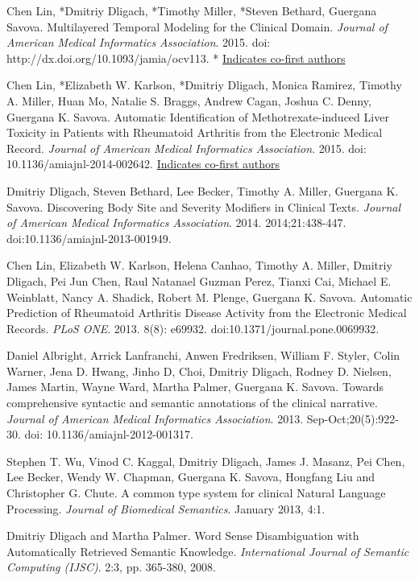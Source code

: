 \documentclass[letterpaper]{article}
\renewenvironment{itemize}{
  \begin{list}{}{
    \setlength{\leftmargin}{1.5em}
  }
}{
  \end{list}
}
\begin{document}
\begin{itemize}
\item *Chen Lin, *Dmitriy Dligach, *Timothy Miller, *Steven Bethard, Guergana Savova. Multilayered Temporal Modeling for the Clinical Domain. \emph{Journal of American Medical Informatics Association}. 2015. doi: http://dx.doi.org/10.1093/jamia/ocv113. * \underline{Indicates co-first authors}
\item *Chen Lin, *Elizabeth W. Karlson, *Dmitriy Dligach, Monica Ramirez, Timothy A. Miller, Huan Mo, Natalie S. Braggs, Andrew Cagan, Joshua C. Denny, Guergana K. Savova. Automatic Identification of Methotrexate-induced Liver Toxicity in Patients with Rheumatoid Arthritis from the Electronic Medical Record. \emph{Journal of American Medical Informatics Association}. 2015. doi: 10.1136/amiajnl-2014-002642. \newline * \underline{Indicates co-first authors}
\item Dmitriy Dligach, Steven Bethard, Lee Becker, Timothy A. Miller, Guergana K. Savova. Discovering Body Site and Severity Modifiers in Clinical Texts. \emph{Journal of American Medical Informatics Association}. 2014. 2014;21:438-447. doi:10.1136/amiajnl-2013-001949.
\item Chen Lin, Elizabeth W. Karlson, Helena Canhao, Timothy A. Miller, Dmitriy Dligach, Pei Jun Chen, Raul Natanael Guzman Perez, Tianxi Cai, Michael E. Weinblatt, Nancy A. Shadick, Robert M. Plenge, Guergana K. Savova. Automatic Prediction of Rheumatoid Arthritis Disease Activity from the Electronic Medical Records. \emph{PLoS ONE}. 2013. 8(8): e69932. doi:10.1371/journal.pone.0069932.
\item Daniel Albright, Arrick Lanfranchi, Anwen Fredriksen, William F. Styler, Colin Warner, Jena D. Hwang, Jinho D, Choi, Dmitriy Dligach, Rodney D. Nielsen, James Martin, Wayne Ward, Martha Palmer, Guergana K. Savova. Towards comprehensive syntactic and semantic annotations of the clinical narrative. \emph{Journal of American Medical Informatics Association}. 2013. Sep-Oct;20(5):922-30. doi: 10.1136/amiajnl-2012-001317.
\item Stephen T. Wu, Vinod C. Kaggal, Dmitriy Dligach, James J. Masanz, Pei Chen, Lee Becker, Wendy W. Chapman, Guergana K. Savova, Hongfang Liu and Christopher G. Chute. A common type system for clinical Natural Language Processing. \emph{Journal of Biomedical Semantics}. January 2013, 4:1.
\item Dmitriy Dligach and Martha Palmer. Word Sense Disambiguation with Automatically Retrieved Semantic Knowledge. \emph {International Journal of Semantic Computing (IJSC)}. 2:3, pp. 365-380, 2008. 
\end{itemize}
\end{document}

